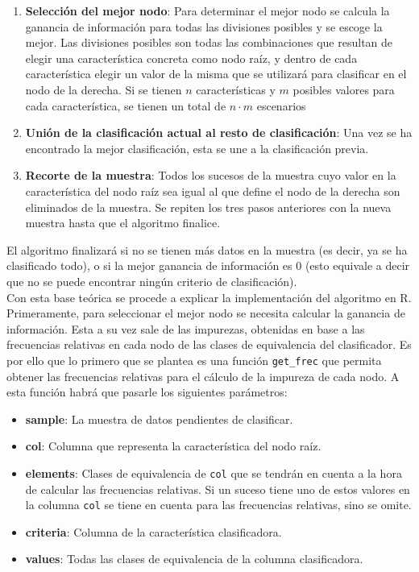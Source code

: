 \documentclass[12pt]{report}\usepackage[]{graphicx}\usepackage[dvipsnames]{xcolor}
\begin{document}
 			\begin{enumerate}
 				\item \textbf{Selección del mejor nodo}: Para determinar el mejor nodo se calcula la ganancia de información para todas las divisiones posibles y se escoge la mejor. Las divisiones posibles son todas las combinaciones que resultan de elegir una característica concreta como nodo raíz, y dentro de cada característica elegir un valor de la misma que se utilizará para clasificar en el nodo de la derecha. Si se tienen $n$ características y $m$ posibles valores para cada característica, se tienen un total de $n \cdot m$ escenarios
 				\item \textbf{Unión de la clasificación actual al resto de clasificación}: Una vez se ha encontrado la mejor clasificación, esta se une a la clasificación previa.
 				\item \textbf{Recorte de la muestra}: Todos los sucesos de la muestra cuyo valor en la característica del nodo raíz sea igual al que define el nodo de la derecha son eliminados de la muestra. Se repiten los tres pasos anteriores con la nueva muestra hasta que el algoritmo finalice.
 			\end{enumerate}
 			
 			El algoritmo finalizará si no se tienen más datos en la muestra (es decir, ya se ha clasificado todo), o si la mejor ganancia de información es 0 (esto equivale a decir que no se puede encontrar ningún criterio de clasificación).\\
 			
 			Con esta base teórica se procede a explicar la implementación del algoritmo en R. Primeramente, para seleccionar el mejor nodo se necesita calcular la ganancia de información. Esta a su vez sale de las impurezas, obtenidas en base a las frecuencias relativas en cada nodo de las clases de equivalencia del clasificador. Es por ello que lo primero que se plantea es una función \texttt{get\_frec} que permita obtener las frecuencias relativas para el cálculo de la impureza de cada nodo. A esta función habrá que pasarle los siguientes parámetros:
 			
 			\begin{itemize}
 				\item \textbf{sample}: La muestra de datos pendientes de clasificar.
 				\item \textbf{col}: Columna que representa la característica del nodo raíz.
 				\item \textbf{elements}: Clases de equivalencia de \texttt{col} que se tendrán en cuenta a la hora de calcular las frecuencias relativas. Si un suceso tiene uno de estos valores en la columna \texttt{col} se tiene en cuenta para las frecuencias relativas, sino se omite. 
 				\item \textbf{criteria}: Columna de la característica clasificadora.
 				\item \textbf{values}: Todas las clases de equivalencia de la columna clasificadora.
 			\end{itemize}
 			
\end{document}
